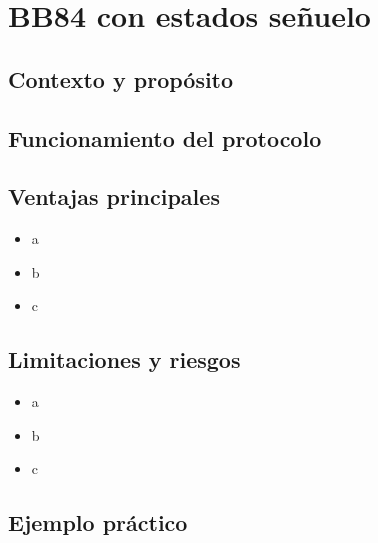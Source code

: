 \section{BB84 con estados señuelo}

\subsection{Contexto y propósito}

\subsection{Funcionamiento del protocolo}


\subsection{Ventajas principales}
\begin{itemize}
    \item a
    \item b
    \item c
\end{itemize}

\subsection{Limitaciones y riesgos}
\begin{itemize}
    \item a
    \item b
    \item c
\end{itemize}

\subsection{Ejemplo práctico}
